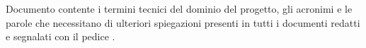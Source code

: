 Documento contente i termini tecnici del dominio del progetto, gli acronimi e le
parole che necessitano di ulteriori spiegazioni presenti in tutti i documenti redatti e segnalati con il pedice .